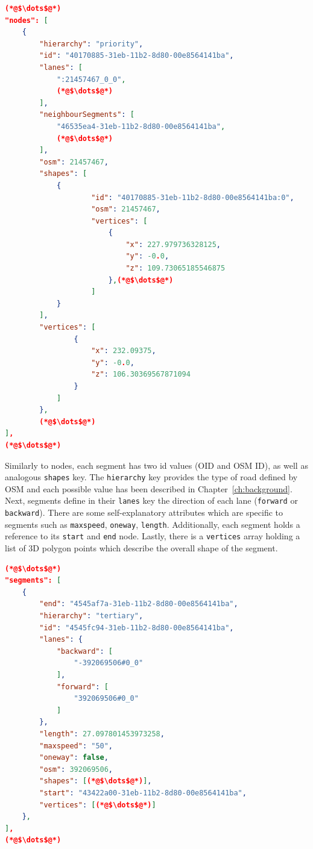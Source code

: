     \begin{scriptsize}
        \begin{lstlisting}[language=json,firstnumber=1,caption={General overview of the node key in the JSON exportformat.},label={lis:format-node}]
(*@$\dots$@*)
"nodes": [
    {
        "hierarchy": "priority",
        "id": "40170885-31eb-11b2-8d80-00e8564141ba",
        "lanes": [
            ":21457467_0_0",
            (*@$\dots$@*)
        ],
        "neighbourSegments": [
            "46535ea4-31eb-11b2-8d80-00e8564141ba",
            (*@$\dots$@*)
        ],
        "osm": 21457467,
        "shapes": [
            {
                    "id": "40170885-31eb-11b2-8d80-00e8564141ba:0",
                    "osm": 21457467,
                    "vertices": [
                        {
                            "x": 227.979736328125,
                            "y": -0.0,
                            "z": 109.73065185546875
                        },(*@$\dots$@*)
                    ]
            }
        ],
        "vertices": [
                {
                    "x": 232.09375,
                    "y": -0.0,
                    "z": 106.30369567871094
                }
            ]
        },
        (*@$\dots$@*)
],
(*@$\dots$@*)
	   \end{lstlisting}
    \end{scriptsize}
    
Similarly to nodes, each segment has two id values (OID and OSM ID), as well as analogous \texttt{shapes} key. The \texttt{hierarchy} key provides the type of road defined by OSM and each possible value has been described in Chapter~\ref{ch:background}. Next, segments define in their \texttt{lanes} key the direction of each lane (\texttt{forward} or \texttt{backward}). There are some self-explanatory attributes which are specific to segments such as \texttt{maxspeed}, \texttt{oneway}, \texttt{length}. Additionally, each segment holds a reference to its \texttt{start} and \texttt{end} node. Lastly, there is a \texttt{vertices} array holding a list of 3D polygon points which describe the overall shape of the segment.\\

\begin{scriptsize}
        \begin{lstlisting}[language=json,firstnumber=1,caption={General overview of the segments key in the JSON export format.},label={lis:format-lanes}]
(*@$\dots$@*)
"segments": [
    {
        "end": "4545af7a-31eb-11b2-8d80-00e8564141ba",
        "hierarchy": "tertiary",
        "id": "4545fc94-31eb-11b2-8d80-00e8564141ba",
        "lanes": {
            "backward": [
                "-392069506#0_0"
            ],
            "forward": [
                "392069506#0_0"
            ]
        },
        "length": 27.097801453973258,
        "maxspeed": "50",
        "oneway": false,
        "osm": 392069506,
        "shapes": [(*@$\dots$@*)],
        "start": "43422a00-31eb-11b2-8d80-00e8564141ba",
        "vertices": [(*@$\dots$@*)]
    },
],           
(*@$\dots$@*)
	   \end{lstlisting}
    \end{scriptsize}

